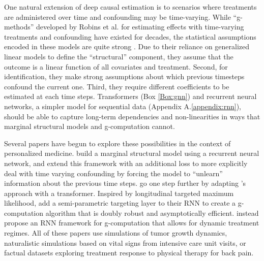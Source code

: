 One natural extension of deep causal estimation is to scenarios where treatments are administered over time and confounding may be time-varying. While “g-methods” developed by Robins et al. for estimating effects with time-varying treatments and confounding have existed for decades, the statistical assumptions encoded in these models are quite strong \citep{robins1994correcting,robins2000marginal,robins2009longitudinal}. Due to their reliance on generalized linear models to define the “structural” component, they assume that the outcome is a linear function of all covariates and treatment. Second, for identification, they make strong assumptions about which previous timesteps confound the current one. Third, they require different coefficients to be estimated at each time steps. Transformers (Box \ref{Box:gnn}) and recurrent neural networks, a simpler model for sequential data (Appendix A.\ref{appendix:rnn}), should be able to capture long-term dependencies and non-linearities in ways that marginal structural models and g-computation cannot.

Several papers have begun to explore these possibilities in the context of personalized medicine. \citet{lim2018forecasting} build a marginal structural model using a recurrent neural network, and \citet{bica2020estimating} extend this framework with an additional loss to more explicitly deal with time varying confounding by forcing the model to “unlearn” information about the previous time steps. \citet{melnychuk2022} go one step further by adapting \citet{bica2020estimating}’s approach with a transformer. Inspired by longitudinal targeted maximum likelihood, \citet{frauen2022estimating} add a semi-parametric targeting layer to their RNN to create a g-computation algorithm that is doubly robust and asymptotically efficient. \citet{lietal2021} instead propose an RNN framework for g-computation that allows for dynamic treatment regimes. All of these papers use simulations of tumor growth dynamics, naturalistic simulations based on vital signs from intensive care unit visits, or factual datasets exploring treatment response to physical therapy for back pain.